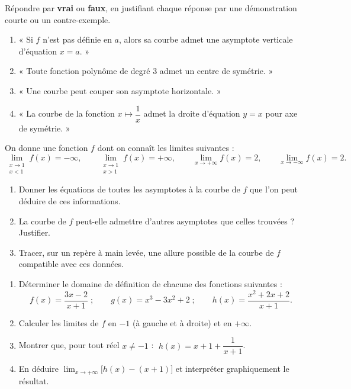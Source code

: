 \documentclass[11pt]{article}
\begin{document}
\begin{exercice}
Répondre par \textbf{vrai} ou \textbf{faux}, en justifiant chaque réponse par une démonstration courte ou un contre-exemple.
\begin{enumerate}
\item « Si $f$ n'est pas définie en $a$, alors sa courbe admet une asymptote verticale d'équation $x=a$. »
\item « Toute fonction polynôme de degré $3$ admet un centre de symétrie. »
\item « Une courbe peut couper son asymptote horizontale. »
\item « La courbe de la fonction $x\longmapsto \dfrac{1}{x}$ admet la droite d'équation $y=x$ pour axe de symétrie. »
\end{enumerate}
\end{exercice}

\begin{exercice}
On donne une fonction $f$ dont on connaît les limites suivantes :
\[ \lim_{\substack{x\to 1\\ x<1}}f(x)=-\infty,\qquad \lim_{\substack{x\to 1\\ x>1}}f(x)=+\infty,\qquad \lim_{x\to +\infty}f(x)=2,\qquad \lim_{x\to -\infty}f(x)=2. \]
\begin{enumerate}
\item Donner les équations de toutes les asymptotes à la courbe de $f$ que l'on peut déduire de ces informations.
\item La courbe de $f$ peut-elle admettre d'autres asymptotes que celles trouvées ? Justifier.
\item Tracer, sur un repère à main levée, une allure possible de la courbe de $f$ compatible avec ces données.
\end{enumerate}
\end{exercice}

\begin{exercice}
\begin{enumerate}
\item Déterminer le domaine de définition de chacune des fonctions suivantes :
\[ f(x)=\frac{3x-2}{x+1}\;;\qquad g(x)=x^3-3x^2+2\;;\qquad h(x)=\frac{x^2+2x+2}{x+1}. \]
\item Calculer les limites de $f$ en $-1$ (à gauche et à droite) et en $+\infty$.
\item Montrer que, pour tout réel $x\neq -1$ : $\;h(x)=x+1+\dfrac{1}{x+1}$.
\item En déduire $\displaystyle\lim_{x\to +\infty}\bigl[h(x)-(x+1)\bigr]$ et interpréter graphiquement le résultat.
\end{enumerate}
\end{exercice}
\end{document}
